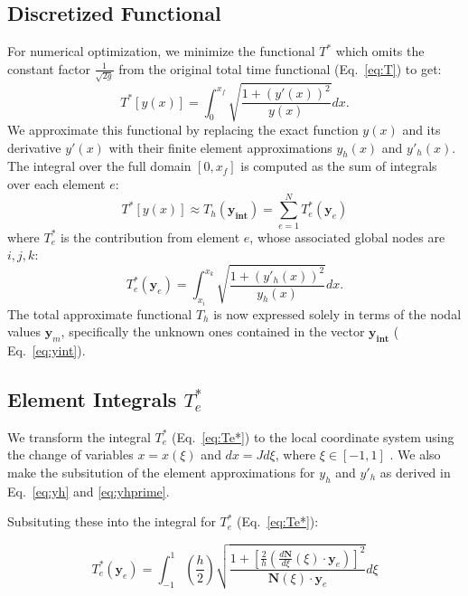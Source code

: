 \documentclass[11pt]{article}
\begin{document}
\subsection{Discretized Functional}
    
    For numerical optimization, we minimize the functional \( T^* \) which omits the constant factor \( \frac{1}{\sqrt{2g}} \) from the original total time functional (Eq.~\eqref{eq:T}) to get:
    \begin{equation}
        T^*[y(x)] = \int_0^{x_f} \sqrt{\frac{1 + (y'(x))^2}{y(x)}} dx .
    \label{eq:T*}
    \end{equation}
    We approximate this functional by replacing the exact function \( y(x) \) and its derivative \( y'(x) \) with their finite element approximations \( y_h (x) \) and \( y'_h (x) \). The integral over the full domain \( [0, x_f] \) is computed as the sum of integrals over each element \(e\):
    \begin{equation}
        T^*[y(x)] \approx T_h(\mathbf{y_\text{int}}) = \sum_{e=1}^{N} T_e^*(\mathbf{y}_e) \label{eq:Th}
    \end{equation}
    where \( T_e^* \) is the contribution from element \(e\), whose associated global nodes are \(i, j, k\):
    \begin{equation}
        T_e^*(\mathbf{y}_e) = \int_{x_{i}}^{x_{k}} \sqrt{\frac{1 + (y'_h(x))^2}{y_h(x)}} dx. \label{eq:Te*}
    \end{equation}
    The total approximate functional \( T_h \) is now expressed solely in terms of the nodal values \(\mathbf{y}_m\), specifically the unknown ones contained in the vector \(\mathbf{y_\text{int}}\) ( Eq.~\eqref{eq:yint}). 

\subsection{Element Integrals \( T^{*} _e \) }

We transform the integral \( T_e^* \) (Eq.~\eqref{eq:Te*}) to the local coordinate system using the change of variables \( x = x(\xi) \) and \( dx = J d\xi \), where \( \xi \in [-1, 1] \) . We also make the subsitution of the element approximations for \( y_h \) and \( y'_h \) as derived in Eq.~\eqref{eq:yh} and \eqref{eq:yhprime}.

Subsituting these into the integral for \( T^{*} _e \) (Eq.~\eqref{eq:Te*}): 
 
\[ 
    T_e^*(\mathbf{y}_e) = \int_{-1}^{1}\left(\frac{h}{2}\right) \sqrt{\frac{1 + \left[ \frac{2}{h} \left( \frac{d\mathbf{N}}{d\xi}(\xi) \cdot \mathbf{y}_e \right)  \right]^2}{\mathbf{N}(\xi) \cdot \mathbf{y}_e}}  d\xi
\]
\end{document}
